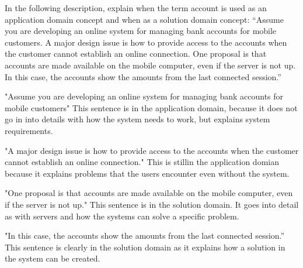 In the following description, explain when the term account is used as an application domain concept and when as a solution domain concept:
	“Assume you are developing an online system for managing bank accounts for mobile customers. A major design issue is how to provide access to the accounts when the customer cannot establish an online connection. One proposal is that accounts are made available on the mobile computer, even if the server is not up. In this case, the accounts show the amounts from the last connected session.”

"Assume you are developing an online system for managing bank accounts for mobile customers"
This sentence is in the application domain, because it does not go in into details with how the system needs to work, but explains system requirements.

"A major design issue is how to provide access to the accounts when the customer cannot establish an online connection."
This is stillin the application domian because it explains problems that the users encounter even without the system.

"One proposal is that accounts are made available on the mobile computer, even if the server is not up." 
This sentence is in the solution domain. It goes into detail as with servers and how the systems can solve a specific problem.

"In this case, the accounts show the amounts from the last connected session.”
This sentence is clearly in the solution domain as it explains how a solution in the system can be created.